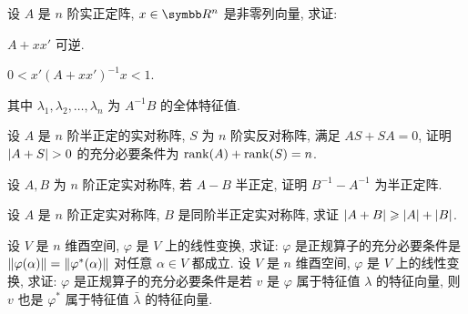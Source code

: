 \begin{exercise}[series=exer]
    \item 设 $ A $ 是 $ n $ 阶实正定阵, $ x \in \R^{n} $ 是非零列向量, 求证:
    \begin{exercise}
        \item $ A + xx' $ 可逆.
        \item $ 0 < x'(A+xx')^{-1}x < 1 $. 
    \end{exercise}
    其中 $ \lambda_{1}, \lambda_{2}, \dots, \lambda_{n} $ 为 $ A^{-1}B $ 的全体特征值.
    \item 设 $ A $ 是 $ n $ 阶半正定的实对称阵, $ S $ 为 $ n $ 阶实反对称阵, 满足 $ AS + SA = 0 $, 证明 $ \abs{A + S} > 0 $ 的充分必要条件为 $ \rank(A) + \rank(S) = n $. 
    \item 设 $ A, B $ 为 $ n $ 阶正定实对称阵, 若 $ A - B $ 半正定, 证明 $ B^{-1} - A^{-1} $ 为半正定阵.
    \item 设 $ A $ 是 $ n $ 阶正定实对称阵, $ B $ 是同阶半正定实对称阵, 求证 $ \abs{A + B} \geqslant \abs{A} + \abs{B} $. 
    \item 设 $ V $ 是 $ n $ 维酉空间, $ \varphi $ 是 $ V $ 上的线性变换, 求证: $ \varphi $ 是正规算子的充分必要条件是 $ \norm{\varphi(\alpha)} = \norm{\varphi^{*}(\alpha)} $ 对任意 $ \alpha \in V $ 都成立.
    \sitem 设 $ V $ 是 $ n $ 维酉空间, $ \varphi $ 是 $ V $ 上的线性变换, 求证: $ \varphi $ 是正规算子的充分必要条件是若 $ v $ 是 $ \varphi $ 属于特征值 $ \lambda $ 的特征向量, 则 $ v $ 也是 $ \varphi^{*} $ 属于特征值 $ \bar\lambda $ 的特征向量.
\end{exercise} 
